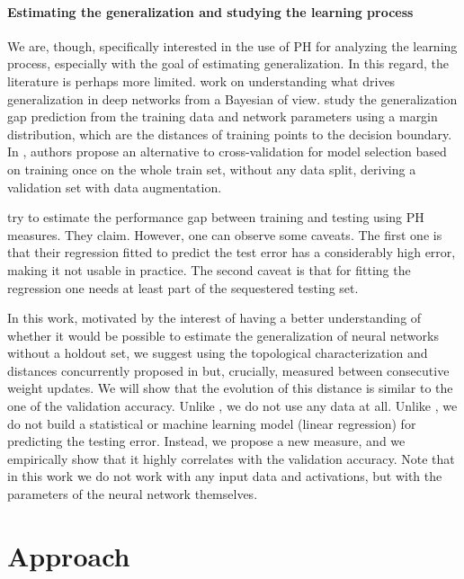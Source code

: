 \documentclass{article}
\begin{document}
\paragraph{Estimating the generalization and studying the learning process} We are, though, specifically interested in the use of PH for analyzing the learning process, especially with the goal of estimating generalization. In this regard, the literature is perhaps more limited. \citet{Jiang2019PredictingTG} work on understanding what drives generalization in deep networks from a Bayesian of view. \citet{Neyshabur2017ExploringGI} study the generalization gap prediction from the training data and network parameters using a margin distribution, which are the distances of training points to the decision boundary. In \citet{DBLP:journals/corr/abs-2012-13309}, authors propose an alternative to cross-validation for model selection based on training once on the whole train set, without any data split, deriving a validation set with data augmentation.

\citet{Corneanu2020ComputingTT} try to estimate the performance gap between training and testing using
PH measures. They claim. However, one can observe some caveats. The first one is that their regression fitted to predict the test error has a considerably high error, making it not usable in practice. The second caveat is that for fitting the regression one needs at least part of the sequestered testing set. 

In this work, motivated by the interest of having a better understanding of whether it would be possible to estimate the generalization of neural networks without a holdout set, we suggest using the topological characterization and distances concurrently proposed in \citet{anonymous} but, crucially, measured between consecutive weight updates. We will show that the evolution of this distance is similar to the one of the validation accuracy. Unlike \citet{DBLP:journals/corr/abs-2012-13309}, we do not use any data at all. Unlike \cite{Corneanu2020ComputingTT}, we do not build a statistical or machine learning model (linear regression) for predicting the testing error. Instead, we propose a new measure, and we empirically show that it highly correlates with the validation accuracy. Note that in this work we do not work with any input data and activations, but with the parameters of the neural network themselves.


\section{Approach}
\label{sec:methods}
\end{document}
